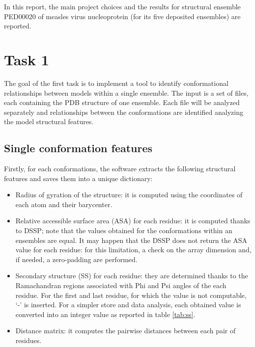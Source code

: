 In this report, the main project choices and the results for structural ensemble PED00020 of measles virus nucleoprotein (for its five deposited ensembles) are reported.

\section{Task 1}\label{sec:task1}
\graphicspath{ {./figures/} }

The goal of the first task is to implement a tool to identify conformational relationships between models within a single ensemble. The input is a set of files, each containing the PDB structure of one ensemble. Each file will be analyzed separately and relationships between the conformations are identified analyzing the model structural features. 


\subsection{Single conformation features}

Firstly, for each conformations, the software extracts the following structural features and saves them into a unique dictionary:
\begin{itemize}
\item Radius of gyration of the structure: it is computed using the coordinates of each atom and their barycenter.
\item Relative accessible surface area (ASA) for each residue: it is computed thanks to DSSP; note that the values obtained for the conformations within an ensembles are equal. It may happen that the DSSP does not return the ASA value for each residue: for this limitation, a check on the array dimension and, if needed, a zero-padding are performed. 
\item Secondary structure (SS) for each residue: they are determined thanks to the Ramachandran regions associated with Phi and Psi angles of the each residue. For the first and last residue, for which the value is not computable, `-' is inserted. For a simpler store and data analysis, each obtained value is converted into an integer value as reported in table \ref{tab:ss}. 
\item Distance matrix: it computes the pairwise distances between each pair of residues.%
\end{itemize}

